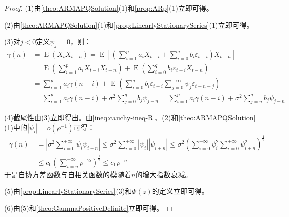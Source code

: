 \begin{proof}
	(1)由\cref{theo:ARMAPQSolution}(1)和\cref{prop:ARp}(1)立即可得。\par
	(2)由\cref{theo:ARMAPQSolution}(1)和\cref{prop:LinearlyStationarySeries}(1)立即可得。\par
	(3)对$j<0$定义$\psi_j=0$，则：
	\begin{align*}
		\gamma(n)&=\operatorname{E}(X_tX_{t-n})=\operatorname{E}\left[\left(\sum_{i=1}^{p}a_iX_{t-i}+\sum_{i=0}^{q}b_i\varepsilon_{t-i}\right)X_{t-n}\right] \\
		&=\operatorname{E}\left(\sum_{i=1}^{p}a_iX_{t-i}X_{t-n}\right)+\operatorname{E}\left(\sum_{i=0}^{q}b_i\varepsilon_{t-i}X_{t-n}\right) \\
		& =\sum_{i=1}^{p}a_i\gamma(n-i)+\operatorname{E}\left(\sum_{i=0}^{q}b_i\varepsilon_{t-i}\sum_{j=0}^{+\infty}\psi_j\varepsilon_{t-n-j}\right) \\
		&=\sum_{i=1}^{p}a_i\gamma(n-i)+\sigma^2\sum_{j=0}^{q}b_j\psi_{j-n}=\sum_{i=1}^{p}a_i\gamma(n-i)+\sigma^2\sum_{j=n}^{q}b_j\psi_{j-n}
	\end{align*}\par
	(4)截尾性由(3)立即得出。由\cref{ineq:cauchy-ineq-R}、(2)和\cref{theo:ARMAPQSolution}(1)中的$|\psi_i|=o(\rho^{-1})$可得：
	\begin{align*}
		|\gamma(n)|&=\left|\sigma^2\sum_{i=0}^{+\infty}\psi_i\psi_{i+n}\right|\leqslant\sigma^2\sum_{i=0}^{+\infty}|\psi_i||\psi_{i+n}|\leqslant\sigma^2\left(\sum_{i=0}^{+\infty}\psi_i^2\sum_{i=0}^{+\infty}\psi_{i+n}^2\right)^{\frac{1}{2}} \\
		&\leqslant c_0\left(\sum_{i=n}^{+\infty}\rho^{-2i}\right)^{\frac{1}{2}}\leqslant c_1\rho^{-n}
	\end{align*}
	于是自协方差函数与自相关函数的模随着$n$的增大指数衰减。\par
	(5)由\cref{prop:LinearlyStationarySeries}(3)和$\Phi(z)$的定义立即可得。\par
	(6)由(5)和\cref{theo:GammaPositiveDefinite}立即可得。
\end{proof}

